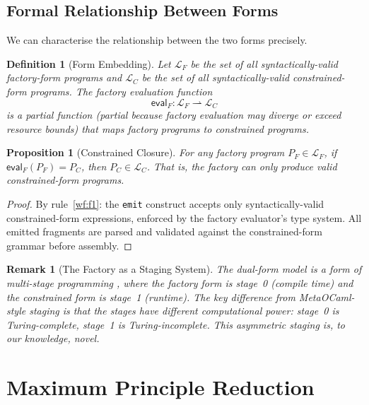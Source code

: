 \documentclass[11pt,a4paper]{article}
\newtheorem{proposition}[theorem]{Proposition}
\newtheorem{definition}[theorem]{Definition}
\newtheorem{remark}[theorem]{Remark}
\begin{document}
\subsection{Formal Relationship Between Forms}

We can characterise the relationship between the two forms precisely.

\begin{definition}[Form Embedding]
Let $\mathcal{L}_F$ be the set of all syntactically-valid factory-form
programs and $\mathcal{L}_C$ be the set of all syntactically-valid
constrained-form programs.  The factory evaluation function
\[
  \mathsf{eval}_F : \mathcal{L}_F \rightharpoonup \mathcal{L}_C
\]
is a partial function (partial because factory evaluation may diverge or
exceed resource bounds) that maps factory programs to constrained programs.
\end{definition}

\begin{proposition}[Constrained Closure]
For any factory program $P_F \in \mathcal{L}_F$, if
$\mathsf{eval}_F(P_F) = P_C$, then $P_C \in \mathcal{L}_C$.  That is, the
factory can only produce valid constrained-form programs.
\end{proposition}

\begin{proof}
By rule~\ref{wf:f1}: the \texttt{emit} construct accepts only
syntactically-valid constrained-form expressions, enforced by the factory
evaluator's type system.  All emitted fragments are parsed and validated
against the constrained-form grammar before assembly.
\end{proof}

\begin{remark}[The Factory as a Staging System]
The dual-form model is a form of \emph{multi-stage programming}
\citep{taha2004gentle}, where the factory form is stage~0 (compile time) and
the constrained form is stage~1 (runtime).  The key difference from
MetaOCaml-style staging is that the stages have \emph{different computational
power}: stage~0 is Turing-complete, stage~1 is Turing-incomplete.  This
asymmetric staging is, to our knowledge, novel.
\end{remark}


\section{Maximum Principle Reduction}
\label{sec:maximum-principle}
\end{document}
